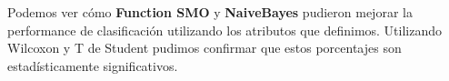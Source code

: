 \documentclass[a0,portrait]{a0poster}
\begin{document}
\begin{multicols}{2}
Podemos ver cómo \textbf{Function SMO} y \textbf{NaiveBayes} pudieron mejorar la performance de clasificación utilizando los atributos que definimos. Utilizando Wilcoxon y T de Student pudimos confirmar que estos porcentajes son estadísticamente significativos. 

{\small 
\nocite{*} %
}
\end{multicols}
\end{document}
